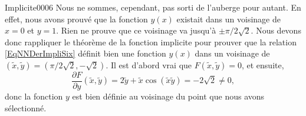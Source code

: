 \begin{corrige}{Implicite0006}
	Nous ne sommes, cependant, pas sorti de l'auberge pour autant. En effet, nous avons prouvé que la fonction $y(x)$ existait dans un voisinage de $x=0$ et $y=1$. Rien ne prouve que ce voisinage va jusqu'à $\pm\pi/2\sqrt{2}$. Nous devons donc rappliquer le théorème de la fonction implicite pour prouver que la relation \eqref{EqNNDerImpliSix} définit bien une fonction $y(x)$ dans un voisinage de $(\tilde x,\tilde y)=(\pi/2\sqrt{2},-\sqrt{2})$. Il est d'abord vrai que $F(\tilde x,\tilde y)=0$, et ensuite,
	\begin{equation}
		\frac{ \partial F }{ \partial y }(\tilde x,\tilde y)=2\tilde y+\tilde x\cos(\tilde x\tilde y)=-2\sqrt{2}\neq 0,
	\end{equation}
	donc la fonction $y$ est bien définie au voisinage du point que nous avons sélectionné.
\end{corrige}
